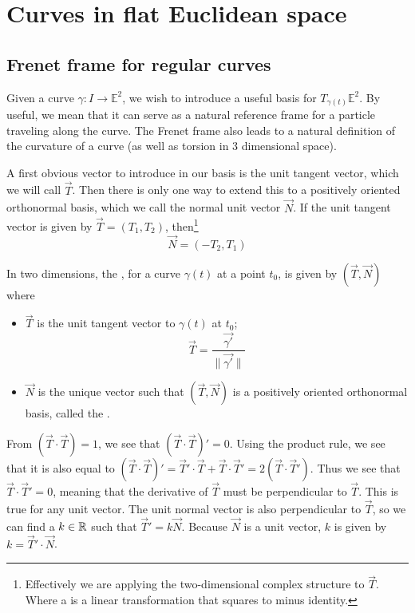 \section{Curves in flat Euclidean space}
\subsection{Frenet frame for regular curves}
Given a curve $\gamma: I \to \mathbb{E}^2$, we wish to introduce a useful basis for $T_{\gamma(t)}\mathbb{E}^2$. By useful, we mean that it can serve as a natural reference frame for a particle traveling along the curve. The Frenet frame also leads to a natural definition of the curvature of a curve (as well as torsion in 3 dimensional space).

A first obvious vector to introduce in our basis is the unit tangent vector, which we will call $\vec{T}$. Then there is only one way to extend this to a positively oriented orthonormal basis, which we call the normal unit vector $\vec{N}$. If the unit tangent vector is given by $\vec{T} = \left(T_1, T_2\right)$, then\footnote{Effectively we are applying the two-dimensional complex structure to $\vec{T}$. Where a  is a linear transformation that squares to minus identity.}
\[ \vec{N} = \left(-T_2, T_1\right) \]
\begin{definition}
In two dimensions, the , for a curve $\gamma(t)$ at a point $t_0$, is given by $(\vec{T}, \vec{N})$ where
\begin{itemize}
\item $\vec{T}$ is the unit tangent vector to $\gamma(t)$ at $t_0$;
\[ \vec{T} = \frac{\vec{\gamma'}}{\lVert \vec{\gamma'} \lVert} \]
\item $\vec{N}$ is the unique vector such that $(\vec{T}, \vec{N})$ is a positively oriented orthonormal basis, called the .
\end{itemize}
\end{definition}

From $(\vec{T}\cdot \vec{T}) = 1$, we see that $(\vec{T}\cdot \vec{T})' = 0$. Using the product rule, we see that it is also equal to $(\vec{T}\cdot \vec{T})' = \vec{T}'\cdot\vec{T} + \vec{T}\cdot\vec{T}' = 2(\vec{T}\cdot \vec{T}')$. Thus we see that $\vec{T}\cdot \vec{T}' = 0$, meaning that the derivative of $\vec{T}$ must be perpendicular to $\vec{T}$. This is true for any unit vector. The unit normal vector is also perpendicular to $\vec{T}$, so we can find a $k \in \mathbb{R}$ such that $\vec{T}' = k \vec{N}$. Because $\vec{N}$ is a unit vector, $k$ is given by $k = \vec{T}'\cdot \vec{N}$.

